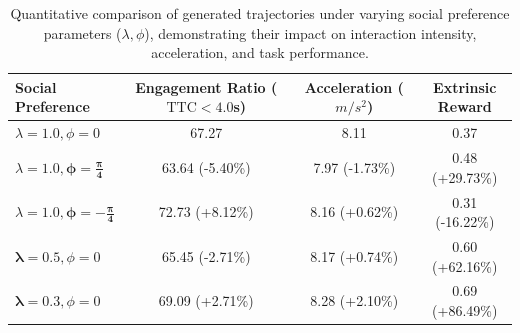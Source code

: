 \begin{table}[ht]
\centering
\renewcommand{\arraystretch}{1.1}
\caption{Quantitative comparison of generated trajectories under varying social preference parameters ($\lambda, \phi$), demonstrating their impact on interaction intensity, acceleration, and task performance.}
\label{tab:social_exp}
\setlength{\tabcolsep}{0pt}
\begin{tabular}{lccc}
\toprule
\parbox[c]{3.25cm}{\textbf{Social \\ Preference}} & 
\parbox[c]{3cm}{\centering \textbf{Engagement \\ Ratio }\\ ($\text{TTC} < 4.0$s)} & 
\parbox[c]{3cm}{\centering \textbf{Acceleration \\ ($m/s^2$)}} & 
\parbox[c]{3cm}{\centering \textbf{ Extrinsic \\ Reward}} \\
\midrule

$\lambda = 1.0, \phi = 0$  & 67.27 & 8.11 & 0.37 \\
\midrule
$\lambda = 1.0, \bm{\phi = \frac{\pi}{4}}$ & 63.64 (\textcolor{softblue}{-5.40\%}) & 7.97 (\textcolor{softblue}{-1.73\%}) & 0.48 (\textcolor{softred}{+29.73\%}) \\
$\lambda = 1.0, \bm{\phi = -\frac{\pi}{4}}$ & 72.73 (\textcolor{softred}{+8.12\%}) & 8.16 (\textcolor{softred}{+0.62\%}) & 0.31 (\textcolor{softblue}{-16.22\%}) \\
$\bm{\lambda = 0.5}, \phi = 0$ & 65.45 (\textcolor{softblue}{-2.71\%}) & 8.17 (\textcolor{softred}{+0.74\%}) & 0.60 (\textcolor{softred}{+62.16\%}) \\
$\bm{\lambda = 0.3}, \phi = 0$ & 69.09 (\textcolor{softred}{+2.71\%}) & 8.28 (\textcolor{softred}{+2.10\%}) & 0.69 (\textcolor{softred}{+86.49\%}) \\
\bottomrule
\end{tabular}
\end{table}


